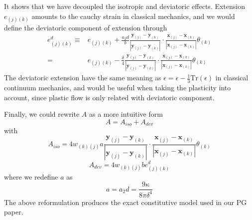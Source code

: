 \documentclass[a4paper,11pt,CJK]{paper}
\newcommand{\bfxj}{\textbf{x}_{(j)}}
\newcommand{\bfyj}{\textbf{y}_{(j)}}
\newcommand{\bfxk}{\textbf{x}_{(k)}}
\newcommand{\bfyk}{\textbf{y}_{(k)}}
\newcommand{\wkj}{w_{(k)(j)}}
\newcommand{\thetak}{\theta_{(k)}}
\begin{document}
It shows that we have decoupled the isotropic and deviatoric effects.
Extension $e_{(j)(k)}$ amounts to the cauchy strain in classical mechanics, and we would define the deviatoric component of extension through
\begin{equation}
\begin{aligned}
e^d_{(j)(k)} \equiv& e_{(j)(k)} + \frac{a_2d}{b}\frac{\bfyj-\bfyk}{|\bfyj-\bfyk|}\cdot\frac{\bfxj-\bfxk}{|\bfxj-\bfxk|}\thetak\\
                  =& e_{(j)(k)} - \frac{\delta}{4}\frac{\bfyj-\bfyk}{|\bfyj-\bfyk|}\cdot\frac{\bfxj-\bfxk}{|\bfxj-\bfxk|}\thetak
\end{aligned}
\end{equation}
The deviatoric extension have the same meaning as $\epsilon = \epsilon - \frac{1}{3}\mathrm{Tr}(\epsilon)$ in classical continuum mechanics,
and would be useful when taking the plasticity into account, since plastic flow is only related with deviatoric component.

Finally, we could rewrite $A$ as a more intuitive form
\begin{equation}
A = A_{iso} + A_{dev}
\end{equation}
with
\begin{equation}
A_{iso} = 4\wkj a\frac{\bfyj-\bfyk}{|\bfyj-\bfyk|}\cdot\frac{\bfxj-\bfxk}{|\bfxj-\bfxk|}\thetak
\end{equation}
\begin{equation}
A_{dev} = 4\wkj b e^d_{(j)(k)}
\end{equation}
where we redefine $a$ as
\begin{equation}
a = a_2d = \frac{9\kappa}{8\pi\delta^4}
\end{equation}
The above reformulation produces the exact constitutive model used in our PG paper.
\end{document}
